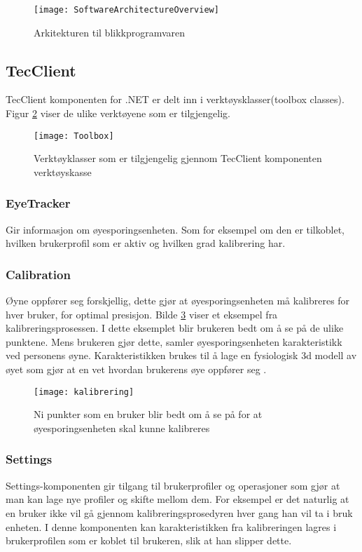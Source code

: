 \begin{figure}[ht!]
\centering
\texttt{[image: SoftwareArchitectureOverview]}
\caption{Arkitekturen til blikkprogramvaren}
\label{fig:overview}
\end{figure}


\subsection{TecClient}

TecClient komponenten for .NET er delt inn i verktøysklasser(toolbox classes). Figur \ref{fig:toolbox} viser de ulike verktøyene som er tilgjengelig.

\begin{figure}[ht!]
\centering
\texttt{[image: Toolbox]}
\caption{Verktøyklasser som er tilgjengelig gjennom TecClient komponenten verktøyskasse}
\label{fig:toolbox}
\end{figure}


\subsubsection{EyeTracker} Gir informasjon om øyesporingsenheten. Som for eksempel om den er tilkoblet, hvilken brukerprofil som er aktiv og hvilken grad kalibrering har.

\subsubsection{Calibration} 
Øyne oppfører seg forskjellig, dette gjør at øyesporingsenheten må kalibreres for hver bruker, for optimal presisjon.  Bilde \ref{fig:kalibre} viser et eksempel fra kalibreringsprosessen. I dette eksemplet blir brukeren bedt om å se på de ulike punktene. Mens brukeren gjør dette, samler øyesporingsenheten karakteristikk ved personens øyne. Karakteristikken brukes til å lage en fysiologisk 3d modell av øyet som gjør at en vet hvordan brukerens øye oppfører seg \cite{www.t5:online}. 

\begin{figure}[ht!]
\centering
\texttt{[image: kalibrering]}
\caption{Ni punkter som en bruker blir bedt om å se på for at øyesporingsenheten skal kunne kalibreres \cite{VHye88:online}}
\label{fig:kalibre}
\end{figure}


\subsubsection{Settings}
Settings-komponenten gir tilgang til brukerprofiler og operasjoner som gjør at man kan lage nye profiler og skifte mellom dem. For eksempel er det naturlig at en bruker ikke vil gå gjennom kalibreringsprosedyren hver gang han vil ta i bruk enheten. I denne komponenten kan karakteristikken fra kalibreringen lagres i brukerprofilen som er koblet til brukeren, slik at han slipper dette. 


